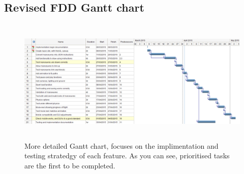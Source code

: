 \begin{landscape}
\section{Revised FDD Gantt chart}
\label{app:gantt2}
\begin{figure}[h!]
  \centering
  	\caption{More detailed Gantt chart, focuses on the implimentation and testing stratedgy of each feature. As you can see, prioritised tasks are the first to be completed.}
      \includegraphics[width=23cm, height=6cm]{images/second.png}
\end{figure}
\end{landscape}
\clearpage